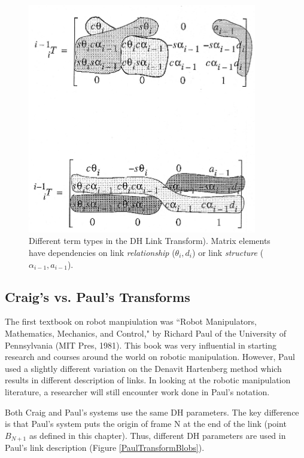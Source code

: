 \begin{figure}
\includegraphics[width=100mm]{figs03/00712.eps}
\caption{Different term types in the DH Link Transform). Matrix elements have dependencies on link {\it relationship} ($\theta_i, d_i$) or link {\it structure} ($\alpha_{i-1}, a_{i-1}$).}\label{LinkTransformBlobs}
\end{figure}


\subsection{Craig's vs. Paul's Transforms}\label{CraigVsPaul}

The first textbook on robot manpiulation was ``Robot Manipulators, Mathematics, Mechanics, and Control," by Richard Paul of the University of Pennsylvania (MIT Pres, 1981).    This book was very influential in starting research and courses around the world on robotic manipulation.   However, Paul used a slightly different variation on the Denavit Hartenberg method which results in different description of links.    In looking at the robotic manipulation literature, a researcher will still encounter work done in Paul's notation.

Both Craig and Paul's systems use the same DH parameters.  The key difference is that Paul's system puts the origin of frame N at the end of the link (point $B_{N+1}$ as defined in this chapter). Thus, different DH parameters are used in Paul's link description (Figure \ref{PaulTransformBlobs}).


